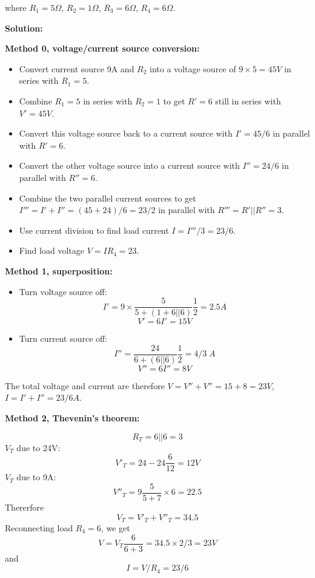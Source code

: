 \begin{enumerate}

  where $R_1=5\Omega$, $R_2=1\Omega$, $R_3=6\Omega$, $R_4=6\Omega$.

  {\bf Solution:}

  {\bf Method 0, voltage/current source conversion:}
  \begin{itemize}
  \item Convert current source 9A and $R_2$ into a voltage source of $9\times 5=45V$
    in series with $R_1=5$. 
  \item Combine $R_1=5$ in series with $R_2=1$ to get $R'=6$ still in series with 
    $V'=45V$. 
  \item Convert this voltage source back to a current source with $I'=45/6$ in 
    parallel with $R'=6$. 
  \item Convert the other voltage source into a current source with $I''=24/6$ in
    parallel with $R''=6$.
  \item Combine the two parallel current sources to get $I'''=I'+I''=(45+24)/6=23/2$
    in parallel with $R'''=R'||R''=3$.
  \item Use current division to find load current $I=I'''/3=23/6$.
  \item Find load voltage $V=IR_4=23$.
  \end{itemize}

  {\bf Method 1, superposition:}
    \begin{itemize}
    \item Turn voltage source off:
      \[ I'=9\times\frac{5}{5+(1+6||6)}\frac{1}{2}=2.5A \]
      \[ V'=6I'=15 V \]
    \item Turn current source off:
      \[ I''=\frac{24}{6+(6||6)}\frac{1}{2}=4/3\;A \]
      \[ V''=6I''=8V \]
  \end{itemize}
  The total voltage and current are therefore $V=V''+V''=15+8=23V$,
  $I=I'+I''=23/6A$.

  {\bf Method 2, Thevenin's theorem:}
  
  \[ R_T=6||6=3 \]
  $V_T$ due to 24V:
  \[ V'_T=24-24 \frac{6}{12}=12V \]
  $V_T$ due to 9A:
  \[ V''_T=9\frac{5}{5+7}\times 6=22.5 \]
  Thererfore
  \[ V_T=V'_T+V''_T=34.5 \]
  Reconnecting load $R_4=6$, we get
  \[ V=V_T \frac{6}{6+3}=34.5\times 2/3=23 V \]
  and
  \[ I=V/R_4=23/6 \]


\end{enumerate}


